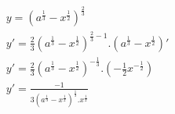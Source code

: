 \begin{ex}
\begin{align}
&y=\left(a^\frac{1}{3}-x^\frac{1}{2}\right)^\frac{2}{3}\nonumber\\
&y'=\frac{2}{3}\left(a^\frac{1}{3}-x^\frac{1}{2}\right)^{\frac{2}{3}-1}.\left(a^\frac{1}{3}-x^\frac{1}{2}\right)'\nonumber\\
&y'=\frac{2}{3}\left(a^\frac{1}{3}-x^\frac{1}{2}\right)^{-\frac{1}{3}}.\left(-\frac{1}{2}x^{-\frac{1}{2}}\right)\nonumber\\
&y'=\frac{-1}{3\left(a^\frac{1}{3}-x^\frac{1}{2}\right)^\frac{1}{3}.x^\frac{1}{2}}\nonumber
\end{align}
\end{ex}